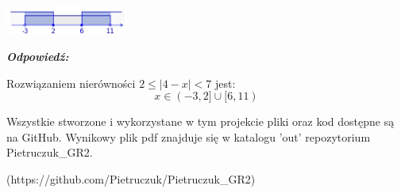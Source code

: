 \documentclass[12pt, a4paper]{report}
\begin{document}
    \bigskip

    \begin{center}
        \includegraphics[width=0.3\textwidth]{fig_8.jpg}
    \end{center}

    \vspace{20pt}                            %
    \noindent
    \emph{\textbf{Odpowiedź:}}

    Rozwiązaniem nierówności $2 \leq |4 - x| < 7$ jest:
    \[x \in (-3, 2] \cup [6, 11)\]

    \vspace{140pt}                            %
    \noindent
    \begin{center}
    Wszystkie stworzone i wykorzystane w tym projekcie pliki oraz kod dostępne są na GitHub. Wynikowy plik pdf znajduje się w katalogu 'out' repozytorium Pietruczuk\_GR2.

    (https://github.com/Pietruczuk/Pietruczuk\_GR2)
    \end{center}
\end{document}
